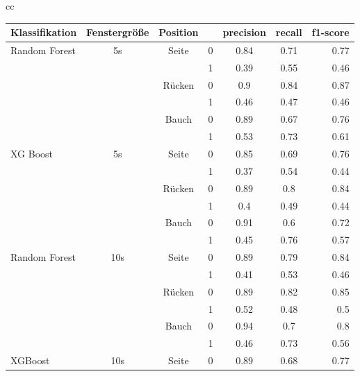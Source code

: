 \begin{table}
  \begin{tabular}{cc}
    \begin{minipage}{1\linewidth}
      \begin{center}
          \begin{tabular}{ | l | c | c | c | c | c | r | }
            \hline
            Klassifikation & Fenstergröße & Position & & precision & recall & f1-score \\ \hline
            Random Forest & 5s & Seite & 0 & 0.84 & 0.71 & 0.77 \\ 
                          &    &       & 1 & 0.39 & 0.55 & 0.46 \\ \hline
                          &    & Rücken& 0 & 0.9  & 0.84 & 0.87 \\ 
                          &    &       & 1 & 0.46 & 0.47 & 0.46 \\ \hline
                          &    & Bauch & 0 & 0.89 & 0.67 & 0.76 \\ 
                          &    &       & 1 & 0.53 & 0.73 & 0.61 \\ \hline
            \hline
            XG Boost & 5s & Seite & 0 & 0.85 & 0.69 & 0.76 \\
                     &    &       & 1 & 0.37 & 0.54 & 0.44 \\ \hline
                     &    & Rücken& 0 & 0.89 & 0.8  & 0.84 \\ 
                     &    &       & 1 & 0.4  & 0.49 & 0.44 \\ \hline
                     &    & Bauch & 0 & 0.91 & 0.6  & 0.72 \\ 
                     &    &       & 1 & 0.45 & 0.76 & 0.57 \\ \hline
            \hline
            Random Forest & 10s & Seite & 0 & 0.89 & 0.79 & 0.84 \\ 
                          &     &       & 1 & 0.41 & 0.53 & 0.46 \\ \hline
                          &     & Rücken& 0 & 0.89 & 0.82 & 0.85 \\
                          &     &       & 1 & 0.52 & 0.48 & 0.5  \\ \hline
                          &     & Bauch & 0 & 0.94 & 0.7  & 0.8  \\
                          &     &       & 1 & 0.46 & 0.73 & 0.56 \\ \hline
            \hline
            XGBoost & 10s & Seite & 0 & 0.89 & 0.68 & 0.77 \\

\end{tabular}
\end{center}
\end{minipage}
\end{tabular}
\end{table}
